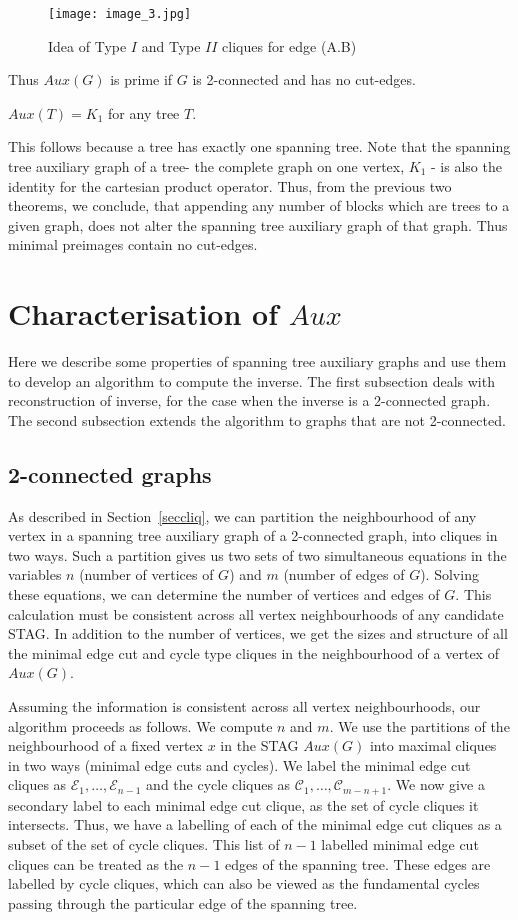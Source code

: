 \documentclass{llncs}
\begin{document}
\begin{figure}[htb]
	\centering
	\texttt{[image: image\_3.jpg]}
	\caption{ Idea of  Type $I$ and Type $II$ cliques for edge (A.B) }
\end{figure}

Thus $Aux(G)$ is prime if $G$ is 2-connected and has no cut-edges.  

\begin{lemma}
	$Aux(T)=K_1$ for any tree $T$. 
\end{lemma}
This follows because a tree has exactly one spanning tree. Note that the spanning tree auxiliary graph of a tree- the complete graph on one vertex, $K_1$ - is also the identity for the cartesian product operator. Thus, from the previous two theorems, we conclude, that appending any number of blocks which are trees to a given graph, does not alter the spanning tree auxiliary graph of that graph. Thus minimal preimages contain no cut-edges.
\section{Characterisation of $Aux$}\label{secalgo}
Here we describe some properties of spanning tree auxiliary graphs and use them to develop an algorithm to compute the inverse. The first subsection deals with reconstruction of inverse, for the case when the inverse is a 2-connected graph. The second subsection extends the algorithm to graphs that are not 2-connected.

\subsection{2-connected graphs}
As described in Section~\ref{seccliq}, we can partition the neighbourhood of any vertex in a spanning tree auxiliary graph of a 2-connected graph, into cliques in two ways. Such a partition gives us two sets of two simultaneous equations in the variables $n$ (number of vertices of $G$) and $m$ (number of edges of $G$). Solving these equations, we can determine the number of vertices and edges of $G$. This calculation must be consistent across all vertex neighbourhoods of any candidate STAG. In addition to the number of vertices, we get the sizes and structure of all the minimal edge cut and cycle type cliques in the neighbourhood of a vertex of $Aux(G)$. 

Assuming the information is consistent across all vertex neighbourhoods, our algorithm proceeds as follows. We compute $n$ and $m$. We use the partitions of the neighbourhood of a fixed vertex $x$ in the STAG $Aux(G)$ into maximal cliques in two ways (minimal edge cuts and cycles). We label the minimal edge cut cliques as $\mathcal{E}_1,\ldots,\mathcal{E}_{n-1}$ and the cycle cliques as $\mathcal{C}_1,\ldots,\mathcal{C}_{m-n+1}$. We now give a secondary label to each minimal edge cut clique, as the set of cycle cliques it intersects. Thus, we have a labelling of each of the minimal edge cut cliques as a subset of the set of cycle cliques. This list of $n-1$ labelled minimal edge cut cliques can be treated as the $n-1$ edges of the spanning tree. These edges are labelled by cycle cliques, which can also be viewed as the fundamental cycles passing through the particular edge of the spanning tree.
\end{document}
